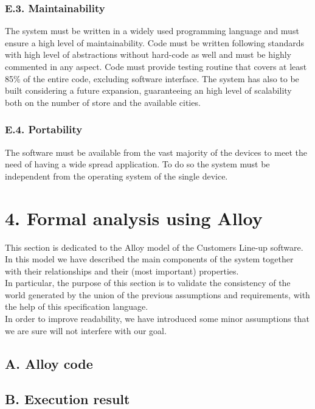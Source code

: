 \subsection{E.3. Maintainability}

The system must be written in a widely used programming language and must ensure a high level of maintainability. Code must be written following standards with high level of abstractions without hard-code as well and must be highly commented in any aspect. Code must provide testing routine that covers at least 85\% of the entire code, excluding software interface. The system has also to be built considering a future expansion, guaranteeing an high level of scalability both on the number of store and the available cities.

\subsection{E.4. Portability}

The software must be available from the vast majority of the devices to meet the need of having a wide spread application. To do so the system must be independent from the operating system of the single device.

\chapter{4. Formal analysis using Alloy}

This section is dedicated to the Alloy model of the Customers Line-up software. In this model we have described the main components of the system together with their relationships and their (most important) properties.\\
In particular, the purpose of this section is to validate the consistency of the world generated by the union of the previous assumptions and requirements, with the help of this specification language.\\
In order to improve readability, we have introduced some minor assumptions that we are sure will not interfere with our goal.

\section{A. Alloy code}



\section{B. Execution result}

